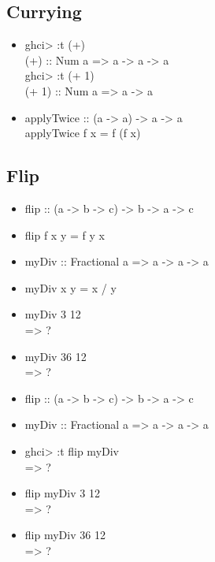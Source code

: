 \documentclass{beamer}                  %
\newcommand{\srule}{
	\rule{\textwidth}{1pt}\\
}
\newlength{\subsecwidth}
\newenvironment{slide}{
	\begin{frame} %
	\settowidth{\subsecwidth}{\insertsubsection} %
	\ifthenelse{\dimtest{\subsecwidth}{<}{1pt}}{ %
		\frametitle{\insertsection\\             %
		\vspace{-1ex}                            %
		\color{fore}\srule                       %
		\par                                     %
		\vspace{-3ex}                            %
		}
	}{                                           %
		\frametitle{\insertsection\ -- \insertsubsection\\ %
		\vspace{-1ex}                            %
		\color{fore}\srule                       %
		\par                                     %
		\vspace{-3ex}                            %
		}
	}
	\Large                                       %
}{
	\end{frame}
}
\begin{document}
\subsection{Currying}

\begin{slide}
  \begin{itemize}
    \item
      ghci> :t (+)\\
      (+) :: Num a => a -> a -> a\\
      ghci> :t (+ 1)\\
      (+ 1) :: Num a => a -> a\\
    \item
      applyTwice :: (a -> a) -> a -> a\\
      applyTwice f x = f (f x)
  \end{itemize}
\end{slide}

\subsection{Flip}
\begin{slide}
  \begin{itemize}
    \item flip :: (a -> b -> c) -> b -> a -> c
    \item flip f x y = f y x
  \end{itemize}
\end{slide}

\begin{slide}
  \begin{itemize}
    \item myDiv :: Fractional a => a -> a -> a
    \item myDiv x y = x / y
    \item myDiv 3 12\\
      => ?
    \item myDiv 36 12\\
      => ?
  \end{itemize}
\end{slide}

\begin{slide}
  \begin{itemize}
    \item flip :: (a -> b -> c) -> b -> a -> c
    \item myDiv :: Fractional a => a -> a -> a
    \item ghci> :t flip myDiv\\
      => ?
    \item flip myDiv 3 12\\
      => ?
    \item flip myDiv 36 12\\
      => ?
  \end{itemize}
\end{slide}
\end{document}
